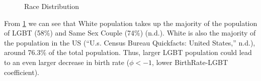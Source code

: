 \documentclass[
]{article}
\begin{document}
\begin{figure}

{\centering {}

}

\caption{Race Distribution}\label{fig:fig-race-distribution}
\end{figure}

From \ref{fig:fig-race-distribution} we can see that White population takes up the majority of the population of LGBT (58\%) and Same Sex Couple (74\%) (n.d.). White is also the majority of the population in the US ({``U.s. Census Bureau Quickfacts: United States,''} n.d.), around 76.3\% of the total population. Thus, larger LGBT population could lead to an even larger decrease in birth rate (\(\phi<-1\), lower BirthRate-LGBT coefficient).
\end{document}
